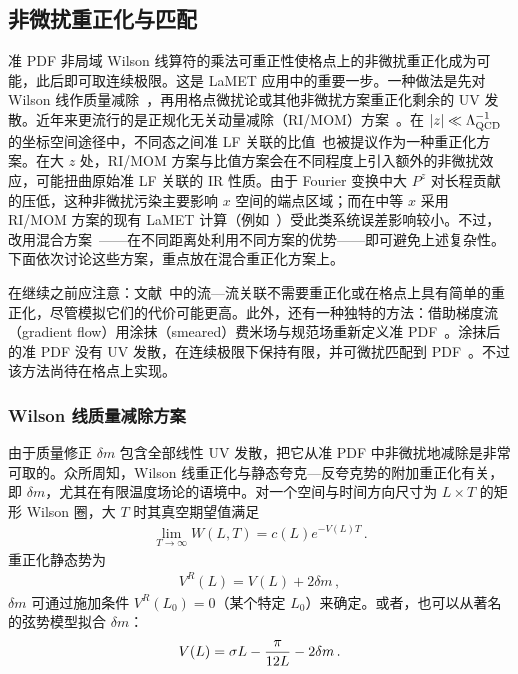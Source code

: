 \subsection{非微扰重正化与匹配}
\label{sec:renorm-npr}
准 PDF 非局域 Wilson 线算符的乘法可重正性使格点上的非微扰重正化成为可能，此后即可取连续极限。这是 LaMET 应用中的重要一步。一种做法是先对 Wilson 线作质量减除~\cite{Musch:2010ka,Ishikawa:2016znu,Chen:2016fxx,Zhang:2017bzy,Green:2017xeu,Green:2020xco}，再用格点微扰论或其他非微扰方案重正化剩余的 UV 发散。近年来更流行的是正规化无关动量减除（RI/MOM）方案~\cite{Constantinou:2017sej,Stewart:2017tvs,Alexandrou:2017huk,Chen:2017mzz,Liu:2018uuj}。在 $|z|\ll \Lambda_{\rm QCD}^{-1}$ 的坐标空间途径中，不同态之间准 LF 关联的比值~\cite{Radyushkin:2017cyf,Orginos:2017kos,Braun:2018brg,Li:2020xml}也被提议作为一种重正化方案。在大 $z$ 处，RI/MOM 方案与比值方案会在不同程度上引入额外的非微扰效应，可能扭曲原始准 LF 关联的 IR 性质。由于 Fourier 变换中大 $P^z$ 对长程贡献的压低，这种非微扰污染主要影响 $x$ 空间的端点区域；而在中等 $x$ 采用 RI/MOM 方案的现有 LaMET 计算（例如~\cite{Alexandrou:2018eet,Lin:2018qky}）受此类系统误差影响较小。不过，改用混合方案~\cite{Ji:2020brr}——在不同距离处利用不同方案的优势——即可避免上述复杂性。
下面依次讨论这些方案，重点放在混合重正化方案上。


在继续之前应注意：文献~\cite{Detmold:2005gg,Braun:2007wv,Ma:2017pxb}中的流—流关联不需要重正化或在格点上具有简单的重正化，尽管模拟它们的代价可能更高。此外，还有一种独特的方法：借助梯度流（gradient flow）用涂抹（smeared）费米场与规范场重新定义准 PDF~\cite{Monahan:2016bvm}。涂抹后的准 PDF 没有 UV 发散，在连续极限下保持有限，并可微扰匹配到 PDF~\cite{Monahan:2017hpu}。不过该方法尚待在格点上实现。

\subsubsection{Wilson 线质量减除方案}
\label{sec:renorm-npr-mass}

由于质量修正 $\delta m$ 包含全部线性 UV 发散，把它从准 PDF 中非微扰地减除是非常可取的。众所周知，Wilson 线重正化与静态夸克—反夸克势的附加重正化有关，即 $\delta m$，尤其在有限温度场论的语境中。对一个空间与时间方向尺寸为 $L\times T$ 的矩形 Wilson 圈，大 $T$ 时其真空期望值满足
\begin{align}
	\lim_{T\to\infty}W(L,T) = c(L) e^{-V(L)T}\,.
\end{align}
重正化静态势为
\begin{align}\label{eq:deltam1}
	V^{R}(L) = V(L) + 2\delta m\,,
\end{align}
$\delta m$ 可通过施加条件 $V^{R}(L_0)=0$（某个特定 $L_0$）来确定。或者，也可以从著名的弦势模型拟合 $\delta m$：
\begin{align}\label{eq:deltam2}
	V(L) = \sigma L- {\pi \over 12 L} -2\delta m\,.
\end{align}

